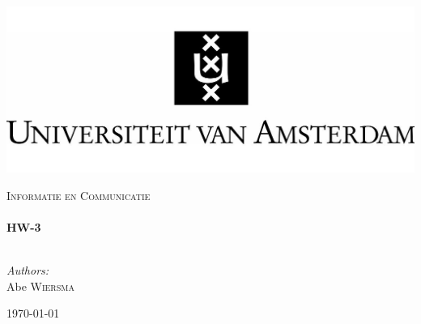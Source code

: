 \begin{titlepage}

\begin{flushleft}
\includegraphics[trim=0mm 0mm 0mm 0mm, width=1\textwidth]{./logo.jpg}\\
\end{flushleft}
\begin{center}
	\textsc{\Large Informatie en Communicatie}\\[0.5cm]

    \HRule \\[0.4cm] { \huge \bfseries HW-3}\\[0.4cm]

    \HRule \\[1.5cm]

\begin{minipage}{0.4\textwidth}
\begin{flushleft} \large \emph{Authors:}\\
Abe \textsc{Wiersma}\\
\end{flushleft}
\end{minipage}
\begin{minipage}{0.4\textwidth} \begin{flushright} \large \end{flushright}\end{minipage}

    \vfill

    {\large \today}

\end{center}
\end{titlepage}
\pagebreak